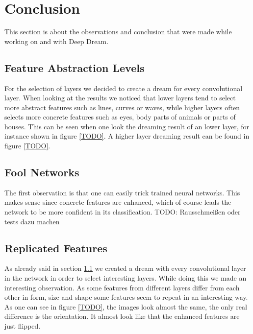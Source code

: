 \section{Conclusion}
\label{sec:conclusion}
This section is about the observations and conclusion that were made while working on and with Deep Dream.
\subsection{Feature Abstraction Levels}
\label{sec:feature-abstraction-levels}
For the selection of layers we decided to create a dream for every convolutional layer.
When looking at the results we noticed that lower layers tend to select more abstract features such as lines, curves or waves, while higher layers often selects more concrete features such as eyes, body parts of animals or parts of houses.
This can be seen when one look the dreaming result of an lower layer, for instance shown in figure \ref{TODO}.
A higher layer dreaming result can be found in figure \ref{TODO}.


\subsection{Fool Networks}
The first observation is that one can easily trick trained neural networks.
This makes sense since concrete features are enhanced, which of course leads the network to be more confident in its classification.
TODO: Rausschmeißen oder tests dazu machen


\subsection{Replicated Features}
As already said in section \ref{sec:feature-abstraction-levels} we created a dream with every convolutional layer in the network in order to select interesting layers.
While doing this we made an interesting observation.
As some features from different layers differ from each other in form, size and shape some features seem to repeat in an interesting way.
As one can see in figure \ref{TODO}, the images look almost the same, the only real difference is the orientation.
It almost look like that the enhanced features are just flipped.

